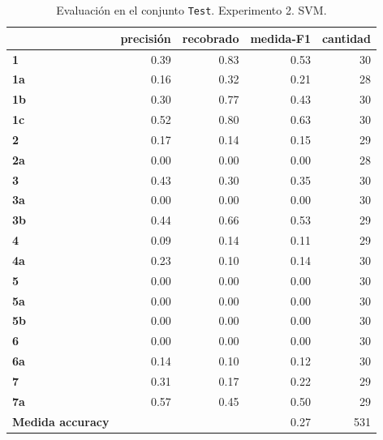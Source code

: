 \begin{table}
\begin{center}
\begin{tabular}{l|rrrr} 
& \bf precisi\'on & \bf recobrado & \bf medida-F1 & \bf   cantidad \\ \hline
         \bf 1 &       0.39  &    0.83  &    0.53   &     30 \\ 
         \bf 1a  &     0.16  &    0.32  &    0.21  &      28 \\
         \bf 1b    &   0.30   &   0.77 &     0.43    &    30 \\
         \bf 1c  &     0.52   &   0.80   &   0.63    &    30 \\
         \bf  2    &   0.17   &   0.14   &   0.15   &     29 \\
         \bf 2a     &  0.00  &    0.00   &   0.00    &    28 \\
        \bf   3   &    0.43  &   0.30  &    0.35  &      30 \\
        \bf  3a  &     0.00 &   0.00  &    0.00  &      30 \\
         \bf  3b  &     0.44 &   0.66  &    0.53    &    29 \\
       \bf   4   &    0.09  &   0.14  &    0.11     &   29 \\
       \bf  4a  &    0.23  &   0.10  &    0.14     &   30 \\
      \bf  5   &    0.00  &   0.00  &    0.00      &  30 \\
      \bf  5a  &     0.00 &   0.00  &    0.00     &   30 \\ 
     \bf   5b  &     0.00 &   0.00  &    0.00     &   30 \\
    \bf    6     &  0.00    &  0.00   &   0.00   &     30 \\
    \bf  6a     &  0.14    &  0.10   &   0.12    &    30 \\
     \bf    7     &  0.31    &  0.17   &   0.22     &   29 \\
   \bf  7a     &  0.57    &  0.45   &   0.50     &   29 \\ \hline
          \bf Medida accuracy     &          &         &  0.27     &  531 \\

\end{tabular}
\caption{Evaluaci\'on en el conjunto \texttt{Test}. Experimento 2. SVM.}\label{test_result}
\end{center}
\end{table}

